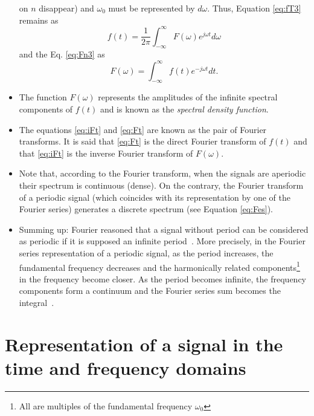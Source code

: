 \begin{itemize}
  on $n$ disappear) and $\omega_0$ must be represented by
  $d\omega$. Thus, Equation \ref{eq:fT3} remains as
  \begin{equation}
    f(t)=\frac{1}{2\pi}\int_{-\infty}^\infty F(\omega)e^{j\omega
      t}d\omega
    \tag{iFt}
    \label{eq:iFt}
  \end{equation}
  and the Eq. \ref{eq:Fn3} as
  \begin{equation}
    F(\omega) = \int_{-\infty}^{\infty} f(t)e^{-j\omega t}dt.
    \tag{Ft}
    \label{eq:Ft}
  \end{equation}
\item The function $F(\omega)$ represents the amplitudes of the
  infinite spectral components of $f(t)$ and is known as the \emph{spectral
  density function}.
\item The equations \ref{eq:iFt} and \ref{eq:Ft} are known as the pair
  of Fourier transforms. It is said that \ref{eq:Ft} is the direct
  Fourier transform of $f(t)$ and that \ref{eq:iFt} is the inverse
  Fourier transform of $F(\omega)$.
\item Note that, according to the Fourier transform, when the signals
  are aperiodic their spectrum is continuous (dense). On the contrary,
  the Fourier transform of a periodic signal (which coincides with its
  representation by one of the Fourier series) generates a discrete
  spectrum (see Equation \ref{eq:Fes}).
\item Summing up: Fourier reasoned that a signal without period can be
  considered as periodic if it is supposed an infinite
  period~\cite{Oppenheim}. More precisely, in the Fourier series
  representation of a periodic signal, as the period increases, the
  fundamental frequency decreases and the harmonically related
  components\footnote{All are multiples of the fundamental frequency
    $\omega_0$} in the frequency become closer. As the period becomes
  infinite, the frequency components form a continuum and the Fourier
  series sum becomes the integral~\cite{Lathi}.
\end{itemize}


\section{Representation of a signal in the time and frequency domains}

